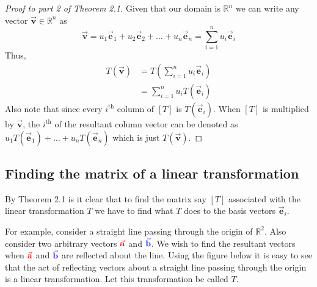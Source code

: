 \documentclass[12pt]{article}
\theoremstyle{remark}
\let\oldvec = \vec
\renewcommand{\vec}[1]{\oldvec{\mathbf{#1}}}
\numberwithin{equation}{section}
\begin{document}
\begin{proof}[Proof to part 2 of Theorem 2.1] 
	Given that our domain is $ \mathbb{R}^n $ we can write any vector $ \vec{v} \in \mathbb{R}^n $ as \[\vec{v} = u_{1}\vec{e}_{1} + u_{2}\vec{e}_{2} + \ldots + u_{n}\vec{e}_{n} = %
	\sum^{n}_{i=1} u_{i}\vec{e}_{i} \]
	Thus, 
	\begin{align*}
		T(\vec{v}) &= T\left(\sum^{n}_{i=1} u_{i}\vec{e}_{i}\right) \\ 
			   &= \sum^{n}_{i=1} u_{i}T(\vec{e}_{i}) 
	\end{align*}
	Also note that since every $ i^{\text{th}} $ column of $ [T] $ is $ T(\vec{e}_{i}) $. When $ [T] $ is multiplied by $ \vec{v} $, the $ i^{\text{th}} $ of the resultant column vector can be denoted as $ u_{1}T(\vec{e}_{1}) + \ldots + u_{n}T(\vec{e}_{n}) $ which is just $ T(\vec{v}) $. 
\end{proof}

\subsection{Finding the matrix of a linear transformation}%
\label{sub:Finding the matrix of a linear transformation}

By Theorem 2.1 is it clear that to find the matrix say $ [T] $ associated with the linear transformation $ T $ we have to find what $ T $ does to the basis vectors $ \vec{e}_{i} $. \par

For example, consider a straight line passing through the origin of $ \mathbb{R}^2 $. Also consider two arbitrary vectors $ \textcolor{red}{\vec{a}} $ and $ \textcolor{blue}{\vec{b}} $. We wish to find the resultant vectors when $ \textcolor{red}{\vec{a}} $ and $ \textcolor{blue}{\vec{b}} $ are reflected about the line. Using the figure below it is easy to see that the act of reflecting vectors about a straight line passing through the origin is a linear transformation. Let this transformation be called $ T $. 
\end{document}

